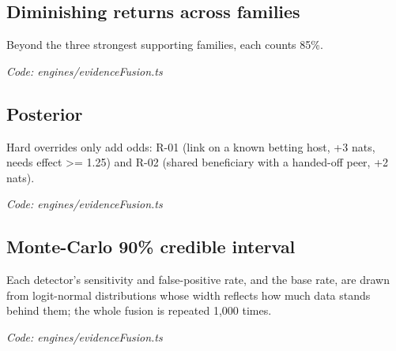 \documentclass[11pt,a4paper]{article}
\newcommand{\where}[1]{\par{\small\itshape\color{mute}Code: #1}\par}
\begin{document}
\subsection*{Diminishing returns across families}
\par\smallskip\noindent{}\par\smallskip
Beyond the three strongest supporting families, each counts 85\%.
\where{engines/evidenceFusion.ts}

\subsection*{Posterior}
\par\smallskip\noindent{}\par\smallskip
Hard overrides only add odds: R-01 (link on a known betting host, +3 nats, needs effect \textgreater{}= 1.25) and R-02 (shared beneficiary with a handed-off peer, +2 nats).
\where{engines/evidenceFusion.ts}

\subsection*{Monte-Carlo 90\% credible interval}
\par\smallskip\noindent{}\par\smallskip
\par\smallskip\noindent{}\par\smallskip
\par\smallskip\noindent{}\par\smallskip
Each detector's sensitivity and false-positive rate, and the base rate, are drawn from logit-normal distributions whose width reflects how much data stands behind them; the whole fusion is repeated 1,000 times.
\where{engines/evidenceFusion.ts}
\end{document}
